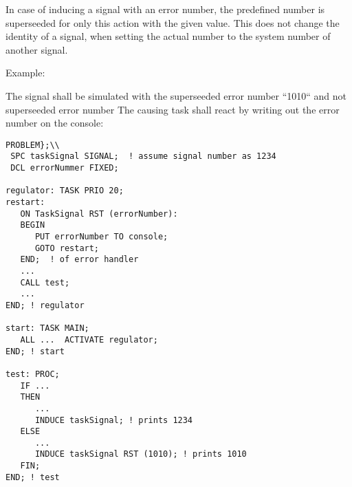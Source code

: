 In case of inducing a signal with an error number, the predefined number
is superseeded for only this action with the given value. This does not change
the identity of a signal, when setting the actual number to the
system number of another signal.  



Example:

The signal  shall be simulated with the 
superseeded error number ``1010`` and not superseeded error number
The causing task shall react by writing out the error
number on the console:

\begin{lstlisting}
PROBLEM};\\
 SPC taskSignal SIGNAL;  ! assume signal number as 1234
 DCL errorNummer FIXED;

regulator: TASK PRIO 20;
restart:
   ON TaskSignal RST (errorNumber):
   BEGIN 
      PUT errorNumber TO console;
      GOTO restart;
   END;  ! of error handler 
   ...
   CALL test;
   ...
END; ! regulator

start: TASK MAIN;
   ALL ...  ACTIVATE regulator;
END; ! start

test: PROC;
   IF ... 
   THEN
      ...
      INDUCE taskSignal; ! prints 1234
   ELSE
      ...
      INDUCE taskSignal RST (1010); ! prints 1010
   FIN;
END; ! test
\end{lstlisting}

